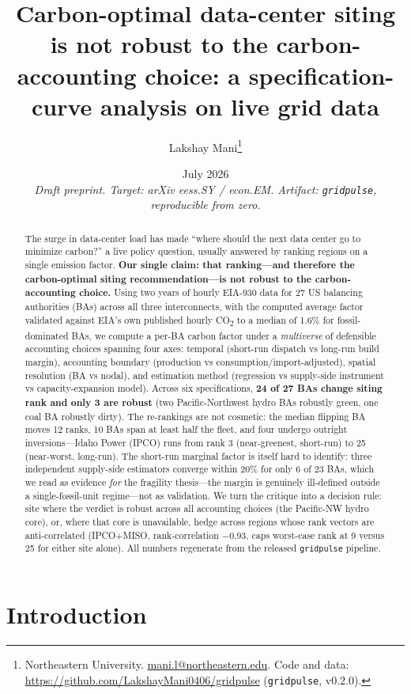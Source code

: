 \documentclass[11pt]{article}
\title{\bfseries Carbon-optimal data-center siting is not robust to the
carbon-accounting choice: a specification-curve analysis on live grid data}
\author{Lakshay Mani\thanks{Northeastern University.
\href{mailto:mani.l@northeastern.edu}{mani.l@northeastern.edu}. Code and data:
\url{https://github.com/LakshayMani0406/gridpulse} (\texttt{gridpulse}, v0.2.0).}}
\date{July 2026\\[4pt]
\normalsize\itshape Draft preprint. Target: arXiv eess.SY / econ.EM.
Artifact: \texttt{gridpulse}, reproducible from zero.}
\newcommand{\coo}{CO\textsubscript{2}}
\begin{document}
\maketitle

\begin{abstract}
\noindent
The surge in data-center load has made ``where should the next data center go to
minimize carbon?'' a live policy question, usually answered by ranking regions on
a single emission factor. \textbf{Our single claim: that ranking---and therefore
the carbon-optimal siting recommendation---is not robust to the carbon-accounting
choice.} Using two years of hourly EIA-930 data for 27 US balancing authorities
(BAs) across all three interconnects, with the computed average factor validated
against EIA's own published hourly \coo{} to a median of 1.6\% for
fossil-dominated BAs, we compute a per-BA carbon factor under a \emph{multiverse}
of defensible accounting choices spanning four axes: temporal (short-run dispatch
vs long-run build margin), accounting boundary (production vs
consumption/import-adjusted), spatial resolution (BA vs nodal), and estimation
method (regression vs supply-side instrument vs capacity-expansion model). Across
six specifications, \textbf{24 of 27 BAs change siting rank and only 3 are robust}
(two Pacific-Northwest hydro BAs robustly green, one coal BA robustly dirty). The
re-rankings are not cosmetic: the median flipping BA moves 12 ranks, 10 BAs span
at least half the fleet, and four undergo outright inversions---Idaho Power (IPCO)
runs from rank 3 (near-greenest, short-run) to 25 (near-worst, long-run). The
short-run marginal factor is itself hard to identify: three independent
supply-side estimators converge within 20\% for only 6 of 23 BAs, which we read as
evidence \emph{for} the fragility thesis---the margin is genuinely ill-defined
outside a single-fossil-unit regime---not as validation. We turn the critique into
a decision rule: site where the verdict is robust across all accounting choices
(the Pacific-NW hydro core), or, where that core is unavailable, hedge across
regions whose rank vectors are anti-correlated (IPCO+MISO, rank-correlation
$-0.93$, caps worst-case rank at 9 versus 25 for either site alone). All numbers
regenerate from the released \texttt{gridpulse} pipeline.
\end{abstract}

\section{Introduction}
\end{document}
